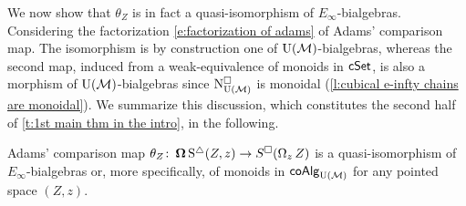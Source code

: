 We now show that $\theta_Z$ is in fact a quasi-isomorphism of $E_{\infty}$-bialgebras.
Considering the factorization \eqref{e:factorization of adams} of Adams' comparison map.
The isomorphism is by construction one of ${\operatorname{U}(\mathcal{M})}$-bialgebras, whereas the second map, induced from a weak-equivalence of monoids in $\mathsf{cSet}$, is also a morphism of ${\operatorname{U}(\mathcal{M})}$-bialgebras
since $\operatorname{N^{\square}_{{\operatorname{U}(\mathcal{M})}}}$ is monoidal (\cref{l:cubical e-infty chains are monoidal}).
We summarize this discussion, which constitutes the second half of \cref{t:1st main thm in the intro}, in the following.

\begin{lemma} \label{l:adams comparison is an e-infty bialgebra map}
	Adams' comparison map $\theta_Z \colon \operatorname{\mathbf{\Omega}} \operatorname{S^{\triangle}}(Z, z) \to S^{\square}(\operatorname{\Omega}_z Z)$ is a quasi-isomorphism of $E_{\infty}$-bialgebras or, more specifically, of monoids in $\mathsf{coAlg}_{\operatorname{U}(\mathcal{M})}$ for any pointed space $(Z, z)$.
\end{lemma}
